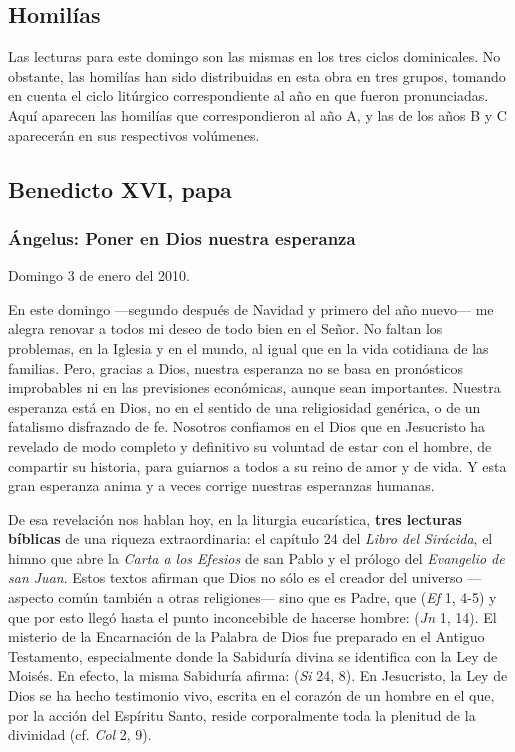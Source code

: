 \begin{body}
\begin{body}
\section{Homilías}

Las lecturas para este domingo son las mismas en los tres ciclos dominicales. No obstante, las homilías han sido distribuidas en esta obra en tres grupos, tomando en cuenta el ciclo litúrgico correspondiente al año en que fueron pronunciadas. Aquí aparecen las homilías que correspondieron al año A, y las de los años B y C aparecerán en sus respectivos volúmenes.

\subsection{Benedicto XVI, papa}

\subsubsection{Ángelus: Poner en Dios nuestra esperanza}

Domingo 3 de enero del 2010.

En este domingo ---segundo después de Navidad y primero del año nuevo--- me alegra renovar a todos mi deseo de todo bien en el Señor. No faltan los problemas, en la Iglesia y en el mundo, al igual que en la vida cotidiana de las familias. Pero, gracias a Dios, nuestra esperanza no se basa en pronósticos improbables ni en las previsiones económicas, aunque sean importantes. Nuestra esperanza está en Dios, no en el sentido de una religiosidad genérica, o de un fatalismo disfrazado de fe. Nosotros confiamos en el Dios que en Jesucristo ha revelado de modo completo y definitivo su voluntad de estar con el hombre, de compartir su historia, para guiarnos a todos a su reino de amor y de vida. Y esta gran esperanza anima y a veces corrige nuestras esperanzas humanas.

De esa revelación nos hablan hoy, en la liturgia eucarística, \textbf{tres lecturas bíblicas} de una riqueza extraordinaria: el capítulo 24 del \emph{Libro del Sirácida}, el himno que abre la \emph{Carta a los Efesios} de san Pablo y el prólogo del \emph{Evangelio de san Juan}. Estos textos afirman que Dios no sólo es el creador del universo ---aspecto común también a otras religiones--- sino que es Padre, que  (\emph{Ef} 1, 4-5) y que por esto llegó hasta el punto inconcebible de hacerse hombre:  (\emph{Jn} 1, 14). El misterio de la Encarnación de la Palabra de Dios fue preparado en el Antiguo Testamento, especialmente donde la Sabiduría divina se identifica con la Ley de Moisés. En efecto, la misma Sabiduría afirma:  (\emph{Si} 24, 8). En Jesucristo, la Ley de Dios se ha hecho testimonio vivo, escrita en el corazón de un hombre en el que, por la acción del Espíritu Santo, reside corporalmente toda la plenitud de la divinidad (cf. \emph{Col} 2, 9).


\end{body}
\end{body}
